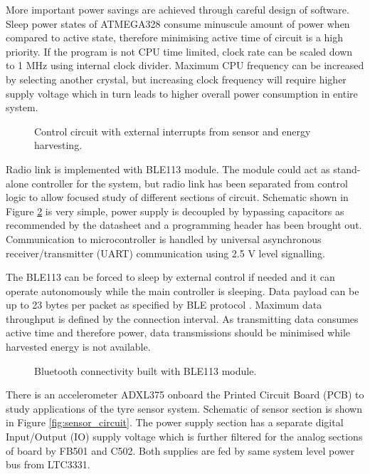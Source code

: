 More important power savings are achieved through careful design of software. Sleep power states of ATMEGA328 consume minuscule amount of power when compared to active state, therefore minimising active time of circuit is a high priority. If the program is not CPU time limited, clock rate can be scaled down to 1 MHz using internal clock divider. Maximum CPU frequency can be increased by selecting another crystal, but increasing clock frequency will require higher supply voltage which in turn leads to higher overall power consumption in entire system.

\begin{figure}[htb]
    \centering
    \def\svgwidth{\columnwidth}
    
    \caption{\label{fig:atmega_circuit} Control circuit with external interrupts from sensor and energy harvesting.}
\end{figure}

Radio link is implemented with BLE113 module. The module could act as stand-alone controller for the system, but radio link has been separated from control logic to allow focused study of different sections of circuit.  Schematic shown in Figure \ref{fig:bluetooth_circuit} is very simple, power supply is decoupled by bypassing capacitors as recommended by the datasheet and a programming header has been brought out. Communication to microcontroller is handled by universal asynchronous receiver/transmitter (UART) communication using 2.5 V level signalling. 

The BLE113 can be forced to sleep by external control if needed and it can operate autonomously while the main controller is sleeping. Data payload can be up to 23 bytes per packet as specified by BLE protocol \cite{Gomez2012}. Maximum data throughput is defined by the connection interval. As transmitting data consumes active time and therefore power, data transmissions should be minimised while harvested energy is not available.

\begin{figure}[htb]
    \centering
    \def\svgwidth{\columnwidth}
    
    \caption{\label{fig:bluetooth_circuit} Bluetooth connectivity built with BLE113 module.}
\end{figure}

There is an accelerometer ADXL375 onboard the Printed Circuit Board (PCB) to study applications of the tyre sensor system. Schematic of sensor section is shown in Figure \ref{fig:sensor_circuit}. The power supply section has a separate digital Input/Output (IO) supply voltage which is further filtered for the analog sections of board by FB501 and C502. Both supplies are fed by same system level power bus from LTC3331.

